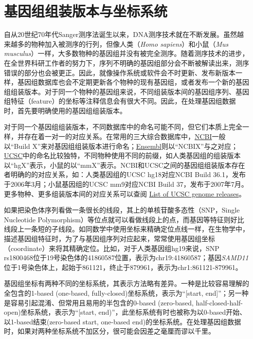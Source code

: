 \section{基因组组装版本与坐标系统}
自从20世纪70年代Sanger测序法诞生以来，DNA测序技术就在不断发展。虽然越来越多的物种加入被测序的行列，但像人类（\textit{Homo sapiens}）和小鼠（\textit{Mus musculus}）一样，大多数物种的基因组并没有被完全测序。随着测序技术的进步，在全世界科研工作者的努力下，序列不明确的基因组部分会不断被解读出来，测序错误的部分也会被更正。因此，就像操作系统或软件会不时更新、发布新版本一样，基因组数据库也会不定期更新各个物种的现有基因组，或者发布一个新的基因组组装版本。对于同一个物种的基因组来说，不同组装版本间的基因组序列、基因组特征（feature）的坐标等注释信息会有很大不同。因此，在处理基因组数据时，首先要明确使用的基因组组装版本。

对于同一个基因组组装版本，不同数据库中的命名可能不同，但它们本质上完全一样，并存在着一对一的对应关系。在常用的三大综合数据库中，\href{http://www.ncbi.nlm.nih.gov}{NCBI}一般以“Build X”来对基因组组装版本进行命名；\href{http://www.ensembl.org/index.html}{Ensembl}则以“NCBIX”与之对应；\href{http://genome.ucsc.edu}{UCSC}中的命名比较独特，不同物种使用不同的前缀，如人类基因组的组装版本以“hgX”表示，小鼠的以“mmX”表示。NCBI和UCSC之间的基因组组装版本存在者明确的的对应关系，如：人类基因组的UCSC hg18对应NCBI Build 36.1，发布于2006年3月；小鼠基因组的UCSC mm9对应NCBI Build 37，发布于2007年7月。更多物种、更多组装版本间的对应关系可以查阅 \href{http://genome.ucsc.edu/FAQ/FAQreleases.html\#release1}{List of UCSC genome releases}。

如果把染色体序列看做一条很长的线段，其上的单核苷酸多态性（SNP，Single Nucleotide Polymorphism）等位点就可以看做线段上的点，而基因等特征则好比线段上一条短的子线段。如同数学中使用坐标来精确定位点线一样，在生物学中，描述基因组特征时，为了与基因组序列对应起来，常常使用基因组坐标（coordinate）来将其精确定位。比如，对于人类基因组hg19来说，SNP rs1800468位于19号染色体的41860587位置，表示为chr19:41860587；基因\textit{SAMD11}位于1号染色体上，起始于861121，终止于879961，表示为chr1:861121-879961。

基因组坐标有两种不同的坐标系统，其表示方法略有差异。一种是比较容易理解的全包含的1-based (one-based, fully-closed)坐标系统，表示为“[start, end]”；另一种是容易引起混淆、但常用且易用的半包含的0-based (zero-based, half-closed-half-open)坐标系统，表示为“[start, end)”，此坐标系统有时也被称为以0-based开始、以1-based结束(zero-based start, one-based end)的坐标系统。在处理基因组数据时，如果对两种坐标系统不加区分，很可能会因差之毫厘而谬以千里。

